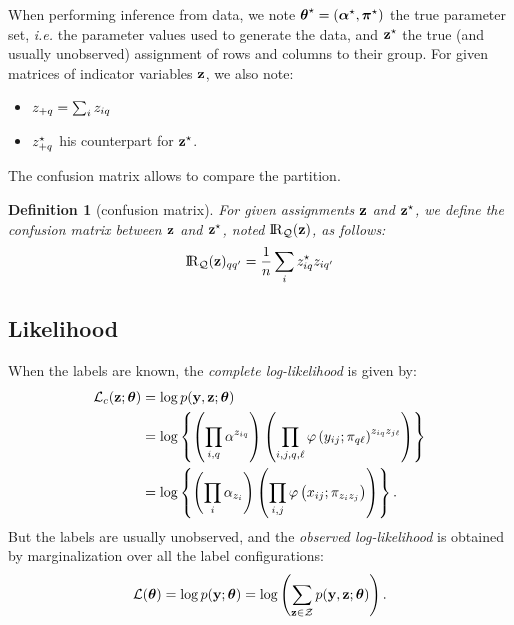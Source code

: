 \documentclass[]{imsart}
\newcommand{\1}{\mathds{1}}
\numberwithin{equation}{section}
\theoremstyle{plain}
\newtheorem{dof}[thm]{Definition}
\theoremstyle{remark}
\begin{document}
When performing inference from data, we note $\boldsymbol{\theta}^\star = (\boldsymbol{\alpha}^\star, \boldsymbol{\pi}^\star)$ the true parameter set, \emph{i.e.} the parameter values used to generate the data, and $\mathbf{z}^\star$ the true (and usually unobserved) assignment of rows and columns to their group.
For given matrices of indicator variables $\mathbf{z}$, we also note:
\begin{itemize}
\item $z_{+q} = \sum_{i} z_{iq}$ 
\item $z^{\star}_{+q}$ his counterpart for $\mathbf{z}^\star$.
\end{itemize}
The confusion matrix allows to compare the partition.
\begin{dof}[confusion matrix]
  \label{def:confusion}
  For given assignments $\mathbf{z}$ and $\mathbf{z}^\star$, we define the \emph{confusion matrix} between $\mathbf{z}$ and $\mathbf{z}^\star$, noted $\RQbz$, as follows:
  \begin{equation}
    \label{eq:confusion-matrix}
    \RQbz_{q q^{\prime}} = \frac{1}{\n} \sum_{\ii} \z^\vrai_{\ii q} \z_{\ii q^{\prime}}
  \end{equation}
\end{dof}

\subsection{Likelihood}
When the labels are known, the {\em complete log-likelihood} is given by:
\begin{equation}
  \label{eq:log-vraisemblance-complete}
  \begin{aligned}
    \Lc(\bz;\btheta)&= \log\prob(\by,\bz;\btheta)\\
    &= \log\left\{ \left(\prodiq{\pii^{\ziq}}\right)\left(\prodijql{\dens\left(\yij;\piql\right)^{\ziq\zjl}}\right) \right\}\\
    &= \log\left\{ \left(\prodi{\pii_{\zi}}\right)\left(\prodij{\dens\left(\xij;\pi_{\zi\zj}\right)}\right) \right\}.	\\
  \end{aligned}
\end{equation}
But the labels are usually unobserved, and the {\em observed log-likelihood} is obtained by marginalization over all the label configurations:
\begin{equation}
  \label{eq:log-vraisemblance-observee}
  \LL(\btheta)=\log\prob(\by;\btheta) = \log \left( \sum_{\bz \in \mcZ}\prob(\by,\bz;\btheta) \right).
\end{equation}
\end{document}
